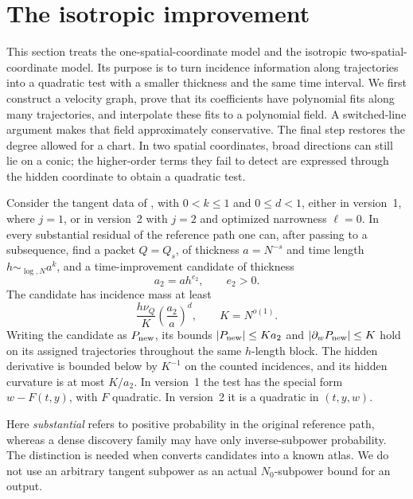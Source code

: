 \section{The isotropic improvement}\label{sec:isotropic}

This section treats the one-spatial-coordinate model and the isotropic
two-spatial-coordinate model. Its purpose is to turn incidence
information along trajectories into a quadratic test with a smaller
thickness and the same time interval. We first construct a velocity
graph, prove that its coefficients have polynomial fits along many
trajectories, and interpolate these fits to a polynomial field.
A switched-line argument makes that field approximately conservative.
The final step restores the degree allowed for a chart. In two
spatial coordinates, broad directions can still lie on a conic; the
higher-order terms they fail to detect are expressed through the
hidden coordinate to obtain a quadratic test.

\begin{theorem}\label{thm:isotropic-improvement}
Consider the tangent data of , with
\(0<k\leq1\) and \(0\leq d<1\), either in version~1, where \(j=1\), or
in version~2 with \(j=2\) and optimized narrowness \(\ell=0\).
In every substantial residual of the reference path one can, after
passing to a subsequence, find a packet \(Q=Q_s\), of thickness
\(a=N^{-s}\) and time length \(h\sim_{\log,N}a^k\), and a
time-improvement candidate of thickness
\[
 a_2=ah^{e_2},\qquad e_2>0.
\]
The candidate has incidence mass at least
\[
 \frac{h\nu_Q}{K}\left(\frac{a_2}{a}\right)^d,
 \qquad K=N^{o(1)}.
\]
Writing the candidate as \(P_{\rm new}\), its bounds
\(|P_{\rm new}|\leq Ka_2\) and
\(|\partial_wP_{\rm new}|\leq K\) hold on its assigned
trajectories throughout the same \(h\)-length block. The hidden
derivative is bounded below by \(K^{-1}\) on the counted incidences,
and its hidden curvature is at most \(K/a_2\). In version~1 the test
has the special form \(w-F(t,y)\), with \(F\) quadratic. In version~2
it is a quadratic in \((t,y,w)\).
\end{theorem}

Here \emph{substantial} refers to positive probability in the
original reference path, whereas a dense discovery family may have
only inverse-subpower probability. The distinction is needed when
 converts candidates into a known
atlas. We do not use an arbitrary tangent subpower as an actual
\(N_0\)-subpower bound for an output.

